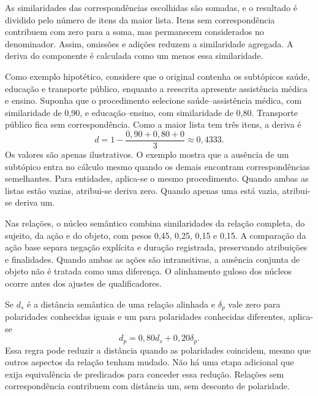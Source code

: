 As similaridades das correspondências escolhidas são somadas, e o resultado é dividido pelo número de itens da maior lista. Itens sem correspondência contribuem com zero para a soma, mas permanecem considerados no denominador. Assim, omissões e adições reduzem a similaridade agregada. A deriva do componente é calculada como um menos essa similaridade.

Como exemplo hipotético, considere que o original contenha os subtópicos saúde, educação e transporte público, enquanto a reescrita apresente assistência médica e ensino. Suponha que o procedimento selecione saúde--assistência médica, com similaridade de 0,90, e educação--ensino, com similaridade de 0,80. Transporte público fica sem correspondência. Como a maior lista tem três itens, a deriva é
\[
 d = 1-\frac{0{,}90+0{,}80+0}{3} \approx 0{,}4333.
\]
Os valores são apenas ilustrativos. O exemplo mostra que a ausência de um subtópico entra no cálculo mesmo quando os demais encontram correspondências semelhantes. Para entidades, aplica-se o mesmo procedimento. Quando ambas as listas estão vazias, atribui-se deriva zero. Quando apenas uma está vazia, atribui-se deriva um.

Nas relações, o núcleo semântico combina similaridades da relação completa, do sujeito, da ação e do objeto, com pesos 0,45, 0,25, 0,15 e 0,15. A comparação da ação base separa negação explícita e duração registrada, preservando atribuições e finalidades. Quando ambas as ações são intransitivas, a ausência conjunta de objeto não é tratada como uma diferença. O alinhamento guloso dos núcleos ocorre antes dos ajustes de qualificadores.

Se $d_s$ é a distância semântica de uma relação alinhada e $\delta_p$ vale zero para polaridades conhecidas iguais e um para polaridades conhecidas diferentes, aplica-se
\begin{equation}
 d_p = 0{,}80d_s + 0{,}20\delta_p.
 \label{eq:cluster-polaridade}
\end{equation}
Essa regra pode reduzir a distância quando as polaridades coincidem, mesmo que outros aspectos da relação tenham mudado. Não há uma etapa adicional que exija equivalência de predicados para conceder essa redução. Relações sem correspondência contribuem com distância um, sem desconto de polaridade.

